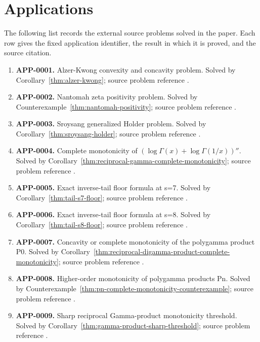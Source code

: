 \documentclass[11pt]{article}
\numberwithin{equation}{section}
\theoremstyle{definition}
\theoremstyle{remark}
\newcommand{\1}{\mathbf 1}
\begin{document}
\section{Applications}
\label{sec:applications}
The following list records the external source problems solved in the paper.  Each row gives the fixed application identifier, the result in which it is proved, and the source citation.
\begin{enumerate}
\item \label{ledger:app-0001}\textbf{APP-0001.} Alzer-Kwong convexity and concavity problem. Solved by Corollary~\ref{thm:alzer-kwong}; source problem reference \cite{app-app-0001-source}.
\item \label{ledger:app-0002}\textbf{APP-0002.} Nantomah zeta positivity problem. Solved by Counterexample~\ref{thm:nantomah-positivity}; source problem reference \cite{nantomah}.
\item \label{ledger:app-0003}\textbf{APP-0003.} Sroysang generalized Holder problem. Solved by Corollary~\ref{thm:sroysang-holder}; source problem reference \cite{sroysang}.
\item \label{ledger:app-0004}\textbf{APP-0004.} Complete monotonicity of \((\log\Gamma(x)+\log\Gamma(1/x))''\). Solved by Corollary~\ref{thm:reciprocal-gamma-complete-monotonicity}; source problem reference \cite{app-app-0004-source}.
\item \label{ledger:app-0005}\textbf{APP-0005.} Exact inverse-tail floor formula at s=7. Solved by Corollary~\ref{thm:tail-s7-floor}; source problem reference \cite{kim-song-tail}.
\item \label{ledger:app-0006}\textbf{APP-0006.} Exact inverse-tail floor formula at s=8. Solved by Corollary~\ref{thm:tail-s8-floor}; source problem reference \cite{kim-song-tail}.
\item \label{ledger:app-0007}\textbf{APP-0007.} Concavity or complete monotonicity of the polygamma product P0. Solved by Corollary~\ref{thm:reciprocal-digamma-product-complete-monotonicity}; source problem reference \cite{app-app-0004-source}.
\item \label{ledger:app-0008}\textbf{APP-0008.} Higher-order monotonicity of polygamma products Pn. Solved by Counterexample~\ref{thm:pn-complete-monotonicity-counterexample}; source problem reference \cite{app-app-0004-source}.
\item \label{ledger:app-0009}\textbf{APP-0009.} Sharp reciprocal Gamma-product monotonicity threshold. Solved by Corollary~\ref{thm:gamma-product-sharp-threshold}; source problem reference \cite{app-app-0009-source}.

\end{enumerate}
\end{document}
